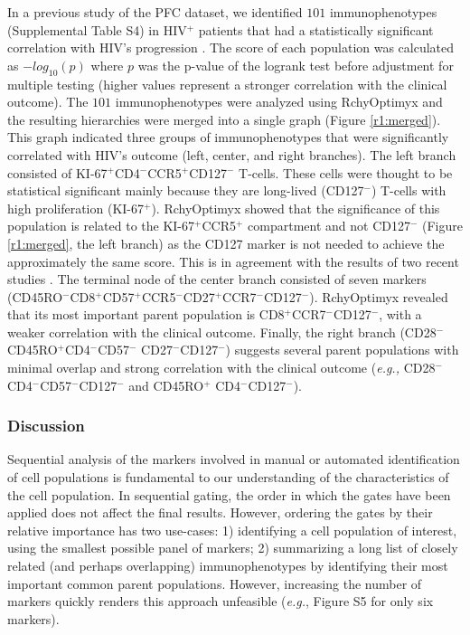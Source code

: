 In a previous study of the PFC dataset, we identified $101$ immunophenotypes (Supplemental Table S4) in HIV$^+$ patients that had a statistically significant correlation with HIV's progression \cite{Aghaeepour2012}.
The score of each population was calculated as $-log_{10}(p)$ where $p$ was the p-value of the logrank test before adjustment for multiple testing (higher values represent a stronger correlation with the clinical outcome).
The $101$ immunophenotypes were analyzed using RchyOptimyx and the resulting hierarchies were merged into a single graph (Figure \ref{r1:merged}).
This graph indicated  three groups of immunophenotypes that were significantly correlated with HIV's outcome (left, center, and right branches).
The left branch consisted of KI-67$^+$CD4$^-$CCR5$^+$CD127$^-$ T-cells.
These cells were thought to be statistical significant mainly because they are long-lived (CD127$^-$) T-cells with high proliferation (KI-67$^+$). 
RchyOptimyx showed that the significance of this population is related to the KI-67$^+$CCR5$^+$ compartment and not CD127$^-$ (Figure \ref{r1:merged}, the left branch) as the CD127 marker is not needed to achieve the approximately the same score.  
This is in agreement with the results of two recent studies \cite{gordon2010disruption,jaspan2011immune}.
The terminal node of the center branch consisted of seven markers (CD45RO$^-$CD8$^+$CD57$^+$CCR5$^-$CD27$^+$CCR7$^-$CD127$^-$). 
RchyOptimyx revealed that its most important parent population is CD8$^+$CCR7$^-$CD127$^-$, with a weaker correlation with the clinical outcome.
Finally, the right branch (CD28$^-$CD45RO$^+$CD4$^-$CD57$^-$ CD27$^-$CD127$^-$) suggests several parent populations with minimal overlap and strong correlation with the clinical outcome (\emph{e.g.,} CD28$^-$CD4$^-$CD57$^-$CD127$^-$ and CD45RO$^+$ CD4$^-$CD127$^-$). 


\subsubsection{Discussion}
Sequential analysis of the markers involved in manual or automated identification of cell populations is fundamental to our understanding of the characteristics of the cell population.
In sequential gating, the order in which the gates have been applied does not affect the final results.
However, ordering the gates by their relative importance has two use-cases: 1) identifying a cell population of interest, using the smallest possible panel of markers; 2) summarizing a long list of closely related (and perhaps overlapping) immunophenotypes by identifying their most important common parent populations.
However, increasing the number of markers quickly renders this approach unfeasible (\emph{e.g.}, Figure S5 for only six markers).

